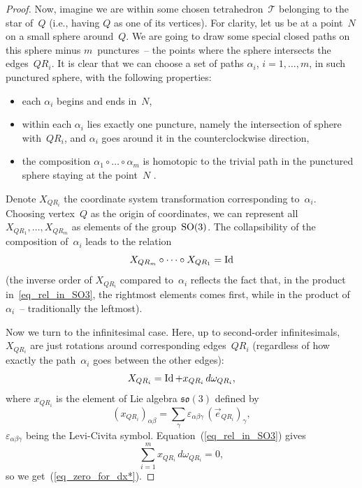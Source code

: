 \documentclass[pdftex]{sigma}
\begin{document}
\begin{proof}
Now, imagine we are within some chosen tetrahedron~$\mathcal T$ belonging to the star of~$Q$ (i.e., having $Q$ as one of its vertices). For clarity, let us be at a point~$N$ on a small sphere around~$Q$. We are going to draw some special closed paths on this sphere minus $m$~punctures~-- the points where the sphere intersects the edges~$QR_i$. It is clear that we can choose a set of paths $\alpha_i$, $i=1,\dots,m$, in such punctured sphere, with the following properties:
\begin{itemize}
\itemsep=0pt
	\item each $\alpha_i$ begins and ends in~$N$,
	\item within each $\alpha_i$ lies exactly one puncture, namely the intersection of sphere with~$QR_i$, and $\alpha_i$ goes around it in the counterclockwise direction,
	\item the composition $\alpha_1 \circ \dots \circ \alpha_m$ is homotopic to the trivial path in the punctured sphere staying at the point~$N$ .	
\end{itemize}

Denote $X_{QR_i}$ the coordinate system transformation corresponding to~$\alpha_i$. Choosing vertex~$Q$ as the origin of coordinates, we can represent all $X_{QR_1}, \ldots, X_{QR_m}$ as elements of the group~${\rm SO}(3)$. The collapsibility of the composition of~$\alpha_i$ leads to the relation
\begin{equation}
X_{QR_m} \circ \dots \circ X_{QR_1} = \mathop{\rm Id}
\label{eq_rel_in_SO3}
\end{equation}
(the inverse order of $X_{QR_i}$ compared to~$\alpha_i$ ref\/lects the fact that, in the product in~\eqref{eq_rel_in_SO3}, the rightmost elements comes f\/irst, while in the product of~$\alpha_i$~-- traditionally the leftmost).

Now we turn to the inf\/initesimal case. Here, up to second-order inf\/initesimals, $X_{QR_i}$ are just rotations around corresponding edges~$QR_i$ (regardless of how exactly the path~$\alpha_i$ goes between the other edges):
\begin{displaymath}
X_{QR_i} = \mathop{\rm Id} + x_{QR_i}\, d\omega_{QR_i},
\end{displaymath}
where $x_{QR_i}$ is the element of Lie algebra $\mathfrak{so}(3)$ def\/ined by
\begin{displaymath}
(x_{QR_i})_{\alpha\beta} = \sum\limits_\gamma\varepsilon_{\alpha\beta\gamma}\, (\vec e_{QR_i})_\gamma ,
\end{displaymath}
$\varepsilon_{\alpha\beta\gamma}$ being the Levi-Civita symbol.
Equation~(\ref{eq_rel_in_SO3}) gives
\begin{displaymath}
\sum_{i=1}^m x_{QR_i}\, d\omega_{QR_i} = 0 ,
\end{displaymath}
so we get~(\ref{eq_zero_for_dx*}).
\end{proof}
\end{document}
